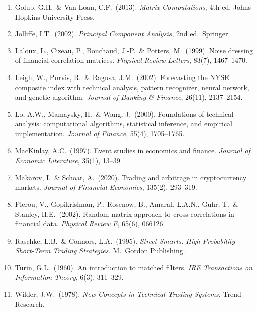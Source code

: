 \documentclass[11pt,a4paper]{article}
\theoremstyle{definition}
\theoremstyle{plain}
\begin{document}
\begin{enumerate}
    \item Golub, G.H.\ \& Van Loan, C.F.\ (2013). \textit{Matrix
          Computations}, 4th ed. Johns Hopkins University Press.

    \item Jolliffe, I.T.\ (2002). \textit{Principal Component Analysis},
          2nd ed.\ Springer.

    \item Laloux, L., Cizeau, P., Bouchaud, J.-P.\ \& Potters, M.\
          (1999). Noise dressing of financial correlation matrices.
          \textit{Physical Review Letters}, 83(7), 1467--1470.

    \item Leigh, W., Purvis, R.\ \& Ragusa, J.M.\ (2002). Forecasting the
          NYSE composite index with technical analysis, pattern recognizer,
          neural network, and genetic algorithm. \textit{Journal of Banking
          \& Finance}, 26(11), 2137--2154.

    \item Lo, A.W., Mamaysky, H.\ \& Wang, J.\ (2000). Foundations of
          technical analysis: computational algorithms, statistical
          inference, and empirical implementation. \textit{Journal of
          Finance}, 55(4), 1705--1765.

    \item MacKinlay, A.C.\ (1997). Event studies in economics and finance.
          \textit{Journal of Economic Literature}, 35(1), 13--39.

    \item Makarov, I.\ \& Schoar, A.\ (2020). Trading and arbitrage in
          cryptocurrency markets. \textit{Journal of Financial Economics},
          135(2), 293--319.

    \item Plerou, V., Gopikrishnan, P., Rosenow, B., Amaral, L.A.N.,
          Guhr, T.\ \& Stanley, H.E.\ (2002). Random matrix approach to
          cross correlations in financial data. \textit{Physical Review E},
          65(6), 066126.

    \item Raschke, L.B.\ \& Connors, L.A.\ (1995). \textit{Street Smarts:
          High Probability Short-Term Trading Strategies.} M.\ Gordon
          Publishing.

    \item Turin, G.L.\ (1960). An introduction to matched filters.
          \textit{IRE Transactions on Information Theory}, 6(3), 311--329.

    \item Wilder, J.W.\ (1978). \textit{New Concepts in Technical Trading
          Systems.} Trend Research.
\end{enumerate}
\end{document}
